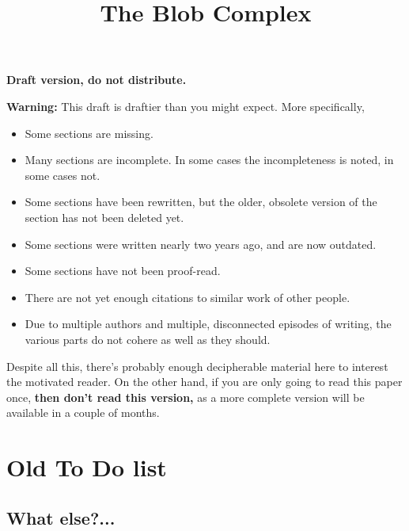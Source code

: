 \documentclass[11pt,leqno]{amsart}
\title{The Blob Complex}
\begin{document}
\makeatletter
{}
\gdef\theequation{\thesection.\arabic{equation}}
\makeatother

\maketitle

\textbf{Draft version, do not distribute.}


\medskip

\noindent
{\bf Warning:} This draft is draftier than you might expect.
More specifically,
\begin{itemize}
\item Some sections are missing.
\item Many sections are incomplete.
In some cases the incompleteness is noted, in some cases not.
\item Some sections have been rewritten, but the older, obsolete version of
the section has not been deleted yet.
\item Some sections were written nearly two years ago, and are now outdated.
\item Some sections have not been proof-read.
\item There are not yet enough citations to similar work of other people.
\item Due to multiple authors and multiple, disconnected episodes of writing,
the various parts do not cohere as well as they should. 
\end{itemize}
Despite all this, there's probably enough decipherable material
here to interest the motivated reader.
On the other hand, if you are only going to read this paper once,
{\bf then don't read this version,} as a more complete version will be available in a couple of months.

\tableofcontents


\section*{Old To Do list}

\subsection*{What else?...}

\relax

\end{document}
